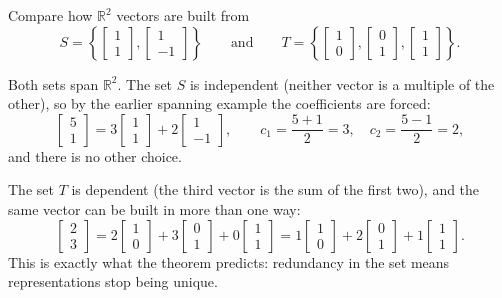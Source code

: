 \begin{example}
Compare how $\mathbb{R}^2$ vectors are built from
\[
S = \left\{ \begin{bmatrix} 1 \\ 1 \end{bmatrix}, \begin{bmatrix} 1 \\ -1 \end{bmatrix} \right\}
\qquad \text{and} \qquad
T = \left\{ \begin{bmatrix} 1 \\ 0 \end{bmatrix}, \begin{bmatrix} 0 \\ 1 \end{bmatrix}, \begin{bmatrix} 1 \\ 1 \end{bmatrix} \right\}.
\]

\begin{solution}
Both sets span $\mathbb{R}^2$. The set $S$ is independent (neither vector is a multiple of the other), so by the earlier spanning example the coefficients are forced:
\[
\begin{bmatrix} 5 \\ 1 \end{bmatrix} = 3\begin{bmatrix} 1 \\ 1 \end{bmatrix} + 2\begin{bmatrix} 1 \\ -1 \end{bmatrix},
\qquad c_1 = \frac{5 + 1}{2} = 3, \quad c_2 = \frac{5 - 1}{2} = 2,
\]
and there is no other choice.

The set $T$ is dependent (the third vector is the sum of the first two), and the same vector can be built in more than one way:
\[
\begin{bmatrix} 2 \\ 3 \end{bmatrix}
= 2\begin{bmatrix} 1 \\ 0 \end{bmatrix} + 3\begin{bmatrix} 0 \\ 1 \end{bmatrix} + 0\begin{bmatrix} 1 \\ 1 \end{bmatrix}
= 1\begin{bmatrix} 1 \\ 0 \end{bmatrix} + 2\begin{bmatrix} 0 \\ 1 \end{bmatrix} + 1\begin{bmatrix} 1 \\ 1 \end{bmatrix}.
\]
This is exactly what the theorem predicts: redundancy in the set means representations stop being unique.
\end{solution}
\end{example}
